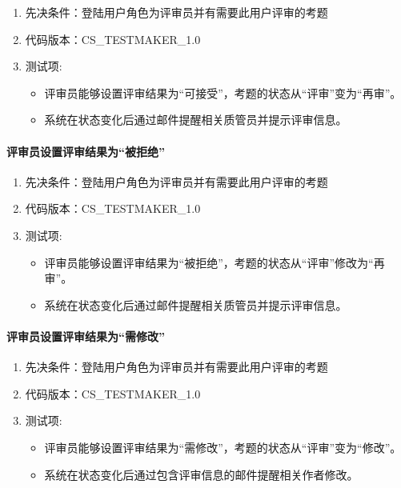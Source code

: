 \documentclass[hyperref, a4paper]{ctexart}
\providecommand{\tightlist}{%
  \setlength{\itemsep}{0pt}\setlength{\parskip}{0pt}}
\let\oldparagraph\paragraph
\renewcommand{\paragraph}[1]{\oldparagraph{#1}\mbox{}}
\begin{document}
\begin{enumerate}
\def\labelenumi{\arabic{enumi}.}
\tightlist
\item
  先决条件：登陆用户角色为评审员并有需要此用户评审的考题
\item
  代码版本：CS\_TESTMAKER\_1.0
\item
  测试项:

  \begin{itemize}
  \tightlist
  \item
    评审员能够设置评审结果为``可接受''，考题的状态从``评审''变为``再审''。
  \item
    系统在状态变化后通过邮件提醒相关质管员并提示评审信息。
  \end{itemize}
\end{enumerate}

\hypertarget{ux8bc4ux5ba1ux5458ux8bbeux7f6eux8bc4ux5ba1ux7ed3ux679cux4e3aux88abux62d2ux7edd}{%
\paragraph{评审员设置评审结果为``被拒绝''}\label{ux8bc4ux5ba1ux5458ux8bbeux7f6eux8bc4ux5ba1ux7ed3ux679cux4e3aux88abux62d2ux7edd}}

\begin{enumerate}
\def\labelenumi{\arabic{enumi}.}
\tightlist
\item
  先决条件：登陆用户角色为评审员并有需要此用户评审的考题
\item
  代码版本：CS\_TESTMAKER\_1.0
\item
  测试项:

  \begin{itemize}
  \tightlist
  \item
    评审员能够设置评审结果为``被拒绝''，考题的状态从``评审''修改为``再审''。
  \item
    系统在状态变化后通过邮件提醒相关质管员并提示评审信息。
  \end{itemize}
\end{enumerate}

\hypertarget{ux8bc4ux5ba1ux5458ux8bbeux7f6eux8bc4ux5ba1ux7ed3ux679cux4e3aux9700ux4feeux6539}{%
\paragraph{评审员设置评审结果为``需修改''}\label{ux8bc4ux5ba1ux5458ux8bbeux7f6eux8bc4ux5ba1ux7ed3ux679cux4e3aux9700ux4feeux6539}}

\begin{enumerate}
\def\labelenumi{\arabic{enumi}.}
\tightlist
\item
  先决条件：登陆用户角色为评审员并有需要此用户评审的考题
\item
  代码版本：CS\_TESTMAKER\_1.0
\item
  测试项:

  \begin{itemize}
  \tightlist
  \item
    评审员能够设置评审结果为``需修改''，考题的状态从``评审''变为``修改''。
  \item
    系统在状态变化后通过包含评审信息的邮件提醒相关作者修改。
  \end{itemize}
\end{enumerate}
\end{document}

